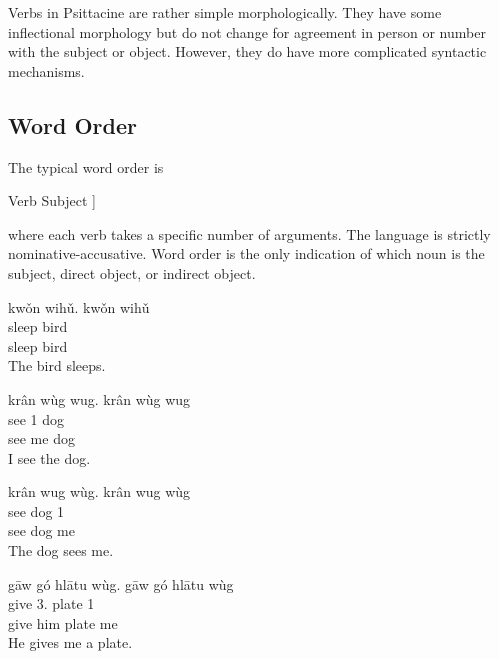Verbs in Psittacine are rather simple morphologically.
They have some inflectional morphology but
do not change for agreement in person or number with the subject or object.
However, they do have more complicated syntactic mechanisms.

\subsection{Word Order}\label{subsec:word-order}

The typical word order is
\begin{center}
    \quad Verb \quad Subject \quad [\quad Direct Object \quad  [ \quad Indirect Object \quad ] \quad ]
\end{center}
where each verb takes a specific number of arguments.
The language is strictly nominative-accusative.
Word order is the only indication of which noun is the subject, direct object, or indirect object.

\begin{exe}
    \ex
    \glt
    kwǒn wihǔ.
    \glll
    kwǒn wihǔ \\
    sleep bird \\
    sleep bird \\
    \glt
    The bird sleeps.
\end{exe}

\begin{exe}
    \ex
    \glt
    krân wùg wug.
    \glll
    krân wùg wug \\
    see 1\Sg{} dog \\
    see me dog \\
    \glt
    I see the dog.
\end{exe}

\begin{exe}
    \ex
    \glt
    krân wug wùg.
    \glll
    krân wug wùg \\
    see dog 1\Sg{} \\
    see dog me \\
    \glt
    The dog sees me.
\end{exe}

\begin{exe}
    \ex
    \glt
    gāw gó hlātu wùg.
    \glll
    gāw gó hlātu wùg \\
    give 3\Sg{}.\Anim{} plate 1\Sg{} \\
    give him plate me \\
    \glt
    He gives me a plate.
\end{exe}

